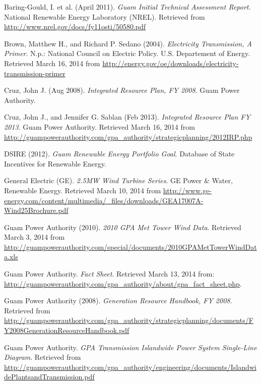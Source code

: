 \documentclass[12pt,letterpaper,fleqn]{report}
\begin{document}
\begin{thebibliography}{99}

  Baring-Gould, I. et al. (April 2011).
  \emph{Guam Initial Technical Assessment Report}.
  National Renewable Energy Laboratory (NREL).
  Retrieved from \url{http://www.nrel.gov/docs/fy11osti/50580.pdf}
  
  Brown, Matthew H., and Richard P. Sedano (2004).
  \emph{Electricity Transmission, A Primer}.
  N.p.: National Council on Electric Policy.
  U.S. Departement of Energy.
  Retrieved March 16, 2014 from
  \url{http://energy.gov/oe/downloads/electricity-transmission-primer}

  Cruz, John J. (Aug 2008).
  \emph{Integrated Resource Plan, FY 2008}.
  Guam Power Authority.

  Cruz, John J., and Jennifer G. Sablan (Feb 2013).
  \emph{Integrated Resource Plan FY 2013}.
  Guam Power Authority.
  Retrieved March 16, 2014 from
  \url{http://guampowerauthority.com/gpa_authority/strategicplanning/2012IRP.php}

  DSIRE (2012).
  \emph{Guam Renewable Energy Portfolio Goal}.
  Database of State Incentives for Renewable Energy.
  
  General Electric (GE).
  \emph{2.5MW Wind Turbine Series}.
  GE Power \& Water, Renewable Energy.
  Retrieved March 10, 2014 from
  \url{http://www.ge-energy.com/content/multimedia/_files/downloads/GEA17007A-Wind25Brochure.pdf}

  Guam Power Authority (2010).
  \emph{2010 GPA Met Tower Wind Data}.
  Retrieved March 3, 2014 from
  \url{http://guampowerauthority.com/special/documents/2010GPAMetTowerWindData.xls}

  Guam Power Authority.
  \emph{Fact Sheet}.
  Retrieved March 13, 2014 from: 
  \url{http://guampowerauthority.com/gpa_authority/about/gpa_fact_sheet.php}.

  Guam Power Authority (2008).
  \emph{Generation Resource Handbook, FY 2008}.
  Retrieved from
  \url{http://guampowerauthority.com/gpa_authority/strategicplanning/documents/FY2008GenerationResourceHandbook.pdf}

  Guam Power Authority.
  \emph{GPA Transmission Islandwide Power System Single-Line Diagram}.
  Retrieved from 
  \url{http://guampowerauthority.com/gpa_authority/engineering/documents/IslandwidePlantsandTransmission.pdf}


\end{thebibliography}
\end{document}
